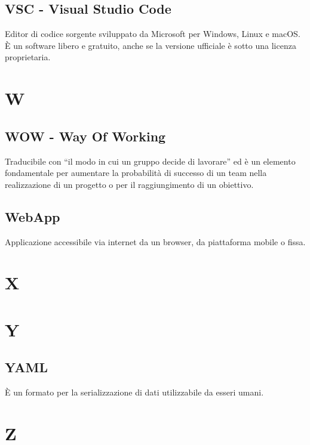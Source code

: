 \documentclass{classes/base}
\begin{document}
        \subsection*{VSC - Visual Studio Code}
        Editor di codice sorgente sviluppato da Microsoft per Windows, Linux e macOS. È un software libero e gratuito, anche se la versione ufficiale è sotto una licenza proprietaria.

        \newpage  
    \section{W}
        \subsection*{WOW - Way Of Working}
        Traducibile con “il modo in cui un gruppo decide di lavorare” ed è un elemento fondamentale per aumentare la probabilità di successo di un team nella realizzazione di un progetto o per il raggiungimento di un obiettivo.  
        
        \subsection*{WebApp}
        Applicazione accessibile via internet da un browser, da piattaforma mobile o fissa. 
        
        \newpage  
    \section{X}
    \newpage  
    \section{Y}
        \subsection*{YAML}
        È un formato per la serializzazione di dati utilizzabile da esseri umani.
        
        \newpage  
    \section{Z}
\end{document}
